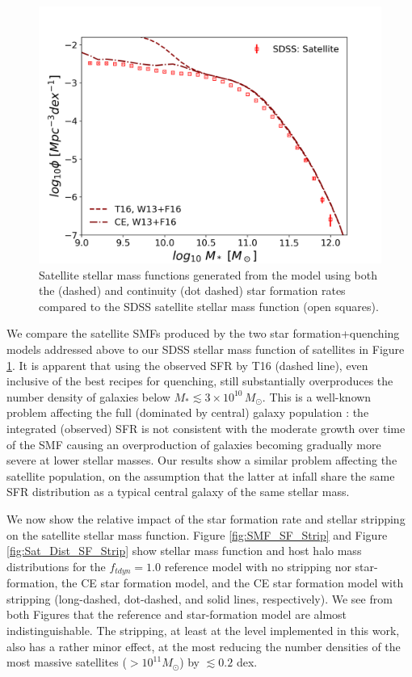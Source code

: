 \begin{figure}
    \centering
    \includegraphics[width = \linewidth]{Figures/Chapter3/Fig9.png}
    \caption{Satellite stellar mass functions generated from the model using both the \citet{Tomczak2016THE4} (dashed) and continuity (dot dashed) star formation rates compared to the SDSS satellite stellar mass function (open squares).}
    \label{fig:SMF_SF_Q}
\end{figure}

We compare the satellite SMFs produced by the two star formation+quenching models addressed above to our SDSS stellar mass function of satellites in Figure \ref{fig:SMF_SF_Q}. It is apparent that using the observed SFR by T16 (dashed line), even inclusive of the best recipes for quenching, still substantially overproduces the number density of galaxies below $M_* \lesssim 3\times 10^{10}\, M_{\odot}$. This is a well-known problem affecting the full (dominated by central) galaxy population \citep[e.g.,][]{Leja2015ReconcilingFunction}: the integrated (observed) SFR is not consistent with the moderate growth over time of the SMF causing an overproduction of galaxies becoming gradually more severe at lower stellar masses. Our results show a similar problem affecting the satellite population, on the assumption that the latter at infall share the same SFR distribution as a typical central galaxy of the same stellar mass.


We now show the relative impact of the star formation rate and stellar stripping on the satellite stellar mass function. Figure \ref{fig:SMF_SF_Strip} and Figure \ref{fig:Sat_Dist_SF_Strip} show stellar mass function and host halo mass distributions for the $f_{tdyn} = 1.0$ reference model with no stripping nor star-formation, the CE star formation model, and the CE star formation model with stripping (long-dashed, dot-dashed, and solid lines, respectively). We see from both Figures that the reference and star-formation model are almost indistinguishable. The stripping, at least at the level implemented in this work, also has a rather minor effect, at the most reducing the number densities of the most massive satellites ($>10^{11}M_{\odot}$) by $\lesssim 0.2$ dex.

